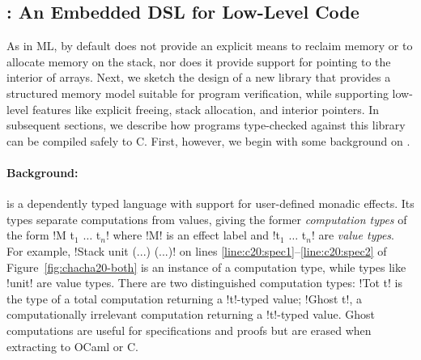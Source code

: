 \subsection{\lowstar: An Embedded DSL for Low-Level Code}
\label{sec:dsl}

As in ML, by default \fstar does not provide an
explicit means to reclaim memory or to allocate memory on the stack, nor does
it provide support for pointing to the interior of arrays. Next, 
we sketch the design of a new \fstar library that provides a
structured memory model suitable for program verification, while
supporting low-level features like explicit freeing, stack
allocation, and interior pointers.
In subsequent sections, we describe how programs
type-checked against this library can be compiled safely to C.
First, however, we begin with some background on \fstar.

\paragraph*{Background:} \fstar is a dependently
typed language with support for user-defined monadic effects.
%
Its types separate computations from values, giving the former
\emph{computation types} of the form \lst!M t$_1$ $\ldots$ t$_n$! where
\lst!M! is an effect label and \lst!t$_1$ $\ldots$ t$_n$! are
\emph{value types}. For example, \lst!Stack unit (...) (...)! on lines
\ref{line:c20:spec1}--\ref{line:c20:spec2}
of Figure~\ref{fig:chacha20-both} is an instance of a
computation type, while types like \lst!unit! are value types.
%
There are two distinguished computation types: \lst!Tot t! is the type
of a total computation returning a \lst!t!-typed value;
%
\lst!Ghost t!, a computationally irrelevant computation returning a
\lst!t!-typed value.
%
Ghost computations are useful for specifications and proofs but
are erased when extracting to OCaml or C.
%
%

